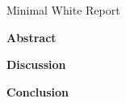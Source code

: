 \documentclass[11pt]{article}
\begin{document}
{\LARGE Minimal White Report}

\vspace{2cm}

\textbf{Abstract}

\lipsum[1]

\vspace{1.5cm}

\textbf{Discussion}

\lipsum[2-3]

\vspace{1.5cm}

\textbf{Conclusion}

\lipsum[4]
\end{document}
